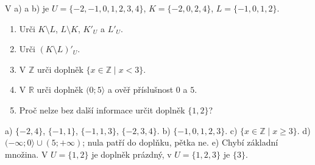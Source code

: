\documentclass[11pt,a4paper]{article}
\begin{document}
\begin{zadaniReseniBox}[title={D1: 12–18 minut}]
V a) a b) je $U=\{-2,-1,0,1,2,3,4\}$, $K=\{-2,0,2,4\}$, $L=\{-1,0,1,2\}$.
\begin{enumerate}[label=\alph*)]
\item Urči $K\setminus L$, $L\setminus K$, $K'_U$ a $L'_U$.
\item Urči $(K\setminus L)'_U$.
\item V $\mathbb Z$ urči doplněk $\{x\in\mathbb Z\mid x<3\}$.
\item V $\mathbb R$ urči doplněk $(0;5\rangle$ a ověř příslušnost $0$ a $5$.
\item Proč nelze bez další informace určit doplněk $\{1,2\}$?
\end{enumerate}
\tcblower
a) $\{-2,4\}$, $\{-1,1\}$, $\{-1,1,3\}$, $\{-2,3,4\}$.
b) $\{-1,0,1,2,3\}$.
c) $\{x\in\mathbb Z\mid x\ge3\}$.
d) $(-\infty;0\rangle\cup(5;+\infty)$; nula patří do doplňku, pětka ne.
e) Chybí základní množina. V $U=\{1,2\}$ je doplněk prázdný,
v $U=\{1,2,3\}$ je $\{3\}$.
\end{zadaniReseniBox}
\end{document}

